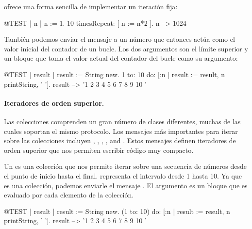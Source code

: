 \documentclass[a4paper,10pt,twoside]{book}
\begin{document}
\noindent
{} ofrece una forma sencilla de implementar un iteración fija:

\begin{code}{@TEST | n |}
n := 1.
10 timesRepeat: [ n := n*2 ].
n --> 1024
\end{code}

También podemos enviar el mensaje  a un número que entonces actúa como el valor inicial del contador de un bucle.
Los dos argumentos son el límite superior y un bloque que toma el valor actual del contador del bucle como su argumento: 

\begin{code}{@TEST | result |}
result := String new.
1 to: 10 do: [:n | result := result, n printString, ' '].
result --> '1 2 3 4 5 6 7 8 9 10 '
\end{code}


\paragraph{Iteradores de orden superior.}
Las colecciones comprenden un gran número de clases diferentes, muchas de las cuales soportan el mismo protocolo.
Los mensajes más importantes para iterar sobre las colecciones incluyen 
, , , ,  and .
Estos mensajes definen iteradores de orden superior que nos permiten escribir código muy compacto.

Un  es una colección que nos permite iterar sobre una secuencia de números desde el punto de inicio hasta el final.  representa el intervalo desde 1 hasta 10.
Ya que es una colección, podemos enviarle el mensaje .
El argumento es un bloque que es evaluado por cada elemento de la colección.

\begin{code}{@TEST | result |}
result := String new.
(1 to: 10) do: [:n | result := result, n printString, ' '].
result --> '1 2 3 4 5 6 7 8 9 10 '
\end{code}
\end{document}
